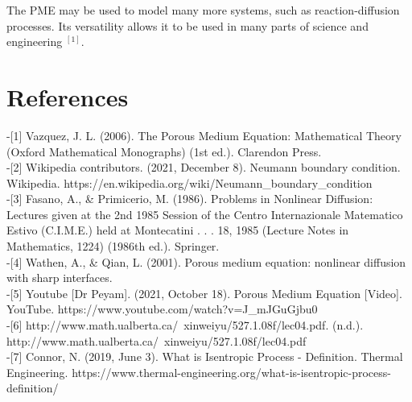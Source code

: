 \documentclass[paper=a4, fontsize=12pt]{scrartcl} %
\numberwithin{equation}{section} %
\numberwithin{table}{section} %
\begin{document}
The PME may be used to model many more systems, such as reaction-diffusion processes. Its versatility allows it to be used in many parts of science and engineering $^{[1]}$.

\newpage

\section{References}
-[1] Vazquez, J. L. (2006). The Porous Medium Equation: Mathematical Theory (Oxford Mathematical Monographs) (1st ed.). Clarendon Press.\\

-[2] Wikipedia contributors. (2021, December 8). Neumann boundary condition. Wikipedia. https://en.wikipedia.org/wiki/Neumann\_boundary\_condition\\

-[3] Fasano, A., \& Primicerio, M. (1986). Problems in Nonlinear Diffusion: Lectures given at the 2nd 1985 Session of the Centro Internazionale Matematico Estivo (C.I.M.E.) held at Montecatini . . . 18, 1985 (Lecture Notes in Mathematics, 1224) (1986th ed.). Springer.\\

-[4] Wathen, A., \& Qian, L. (2001). Porous medium equation: nonlinear diffusion with sharp interfaces.\\

-[5] Youtube [Dr Peyam]. (2021, October 18). Porous Medium Equation [Video]. YouTube. https://www.youtube.com/watch?v=J\_mJGuGjbu0\\

-[6] http://www.math.ualberta.ca/~xinweiyu/527.1.08f/lec04.pdf. (n.d.).\\ http://www.math.ualberta.ca/~xinweiyu/527.1.08f/lec04.pdf\\

-[7] Connor, N. (2019, June 3). What is Isentropic Process - Definition. Thermal Engineering. https://www.thermal-engineering.org/what-is-isentropic-process-definition/\\
\end{document}
